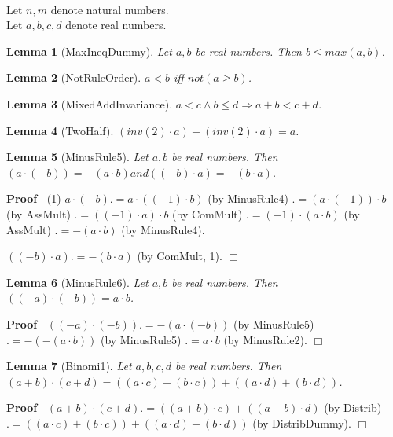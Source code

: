 \documentclass{article}
\newenvironment{forthel}{\begin{leftbar}}{\end{leftbar}}
\newenvironment{proof}{\noindent\textbf{Proof\ }}{\hspace*{\fill}$\Box$\medskip}
\newtheorem{lemma}{Lemma}
\begin{document}
\begin{forthel}
	\\
	Let $n,m$ denote natural numbers.\\
	Let $a,b,c,d$ denote real numbers.
	
	
	
	\begin{lemma}[MaxIneqDummy]
	Let $a,b$ be real numbers. Then $b \leq max(a,b)$.
	\end{lemma}
	
	\begin{lemma}[NotRuleOrder]
	$a < b$ iff $not(a \geq b)$.
	\end{lemma}
	
	\begin{lemma}[MixedAddInvariance]
	$a < c \wedge b \leq d \Rightarrow a + b < c + d$.
	\end{lemma}
	
	\begin{lemma}[TwoHalf]
	$(inv(2) \cdot a) + (inv(2) \cdot a) = a$.
	\end{lemma}
	
	\begin{lemma}[MinusRule5]
	Let $a,b$ be real numbers. 
	Then $(a \cdot (-b)) = -(a \cdot b) and ((-b) \cdot a) = -(b \cdot a)$.
	\end{lemma}
	\begin{proof}
	(1) $a \cdot (-b) .= a \cdot ((-1) \cdot b)$ (by MinusRule4)
	$.= (a \cdot (-1)) \cdot b$ (by AssMult)
	$.= ((-1) \cdot a) \cdot b$ (by ComMult)
	$.= (-1) \cdot (a \cdot b)$ (by AssMult)
	$.= -(a \cdot b)$ (by MinusRule4).
	
	$((-b) \cdot a) .= -(b \cdot a)$ (by ComMult, 1).
	\end{proof}
	
	\begin{lemma}[MinusRule6]
	Let $a,b$ be real numbers. 
	Then $((-a) \cdot (-b)) = a \cdot b$.
	\end{lemma}
	\begin{proof}
	$((-a) \cdot (-b)) .= -(a \cdot (-b))$ (by MinusRule5)
	$.= -(-(a \cdot b))$ (by MinusRule5)
	$.= a \cdot b$ (by MinusRule2).
	\end{proof}
	
	\begin{lemma}[Binomi1]
	Let $a,b,c,d$ be real numbers.
	Then $(a + b) \cdot (c + d) = ((a \cdot c) + (b \cdot c)) + ((a \cdot d) + (b \cdot d))$.
	\end{lemma}
	\begin{proof}
	$(a + b) \cdot (c + d) .= ((a + b) \cdot c) + ((a + b) \cdot d)$ (by Distrib)
	$.= ((a \cdot c) + (b \cdot c)) + ((a \cdot d) + (b \cdot d))$ (by DistribDummy).
	\end{proof}
	

\end{forthel}
\end{document}
